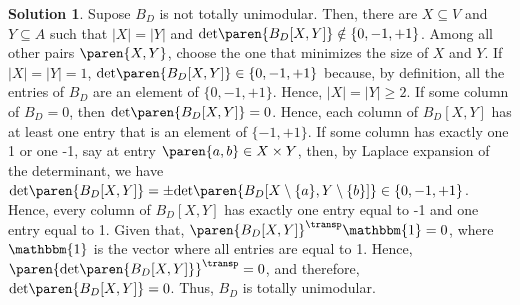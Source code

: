 \documentclass[11pt,leqno,final]{amsart}
\theoremstyle{definition}
\newtheorem{solution}{Solution}
\begin{document}
\begin{solution}
Supose $B_D$ is not totally unimodular. Then, there are $X \subseteq V$ and $Y \subseteq A$ such that $|X| = |Y|$ and $\text{det} \paren{B_D[X, Y]} \notin \{0, -1, +1\}$. Among all other pairs $\paren{X,Y}$, choose the one that minimizes the size of $X$ and $Y$. If $|X| = |Y| = 1$, $\text{det} \paren{B_D[X, Y]} \in \{0, -1, +1\}$ because, by definition, all the entries of $B_D$ are an element of $\{0, -1, +1\}$. Hence, $|X| = |Y| \geq 2$. If some column of $B_D = 0$, then $\text{det}\paren{B_D[X, Y]} = 0$. Hence, each column of $B_D[X, Y]$ has at least one entry that is an element of $\{-1, +1\}$. 
If some column has exactly one 1 or one -1, say at entry $\paren{a,b} \in X \times Y$, then, by Laplace expansion of the determinant, we have $\text{det} \paren{B_D[X, Y]} = \pm \text{det}\paren{B_D[X \setminus \{a\}, Y \setminus \{b\}]} \in \{0, -1, +1\}$. Hence, every column of $B_D[X, Y]$ has exactly one entry equal to -1 and one entry equal to 1. Given that, $\paren{B_D[X, Y]}^{\transp}\mathbbm{1} = 0$, where $\mathbbm{1}$ is the vector where all entries are equal to 1. Hence, $\paren{\text{det}\paren{B_D[X, Y]}}^{\transp} = 0$, and therefore, $\text{det}\paren{B_D[X, Y]} = 0$. Thus, $B_D$ is totally unimodular.


\end{solution}
\end{document}
